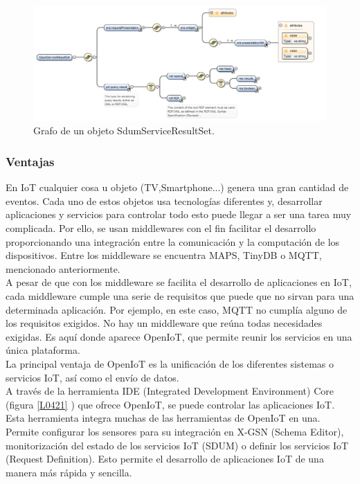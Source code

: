 \documentclass[12pt, twoside]{book}
\begin{document}
\begin{figure}[H]
\centering
\includegraphics[scale=0.5]{images/sdum_service}
\caption{Grafo de un objeto SdumServiceResultSet.}\label{L0422}
\end{figure}

\subsubsection*{Ventajas}
En IoT cualquier cosa u objeto (TV,Smartphone...) genera una gran cantidad de eventos. Cada uno de estos objetos usa tecnologías diferentes y, desarrollar aplicaciones y servicios para controlar todo esto puede llegar a ser una tarea muy complicada. Por ello, se usan middlewares con el fin facilitar el desarrollo proporcionando una integración entre la comunicación y la computación de los dispositivos. Entre los middleware se encuentra MAPS, TinyDB o MQTT, mencionado anteriormente.\\

A pesar de que con los middleware se facilita el desarrollo de aplicaciones en IoT, cada middleware cumple una serie de requisitos que puede que no sirvan para una determinada aplicación. Por ejemplo, en este caso, MQTT no cumplía alguno de los requisitos exigidos. No hay un middleware que reúna todas necesidades exigidas. Es aquí donde aparece OpenIoT, que permite reunir los servicios en una única plataforma.\\

La principal ventaja de OpenIoT es la unificación de los diferentes sistemas o servicios IoT, así como el envío de datos.\\

A través de la herramienta IDE (Integrated Development Environment) Core (figura \ref{L0421} ) que ofrece OpenIoT, se puede controlar las aplicaciones IoT. Esta herramienta integra muchas de las herramientas de OpenIoT en una. Permite configurar los sensores para su integración en X-GSN (Schema Editor), monitorización del estado de los servicios IoT (SDUM) o definir los servicios IoT (Request Definition). Esto permite el desarrollo de aplicaciones IoT de una manera más rápida y sencilla.\\
\end{document}
